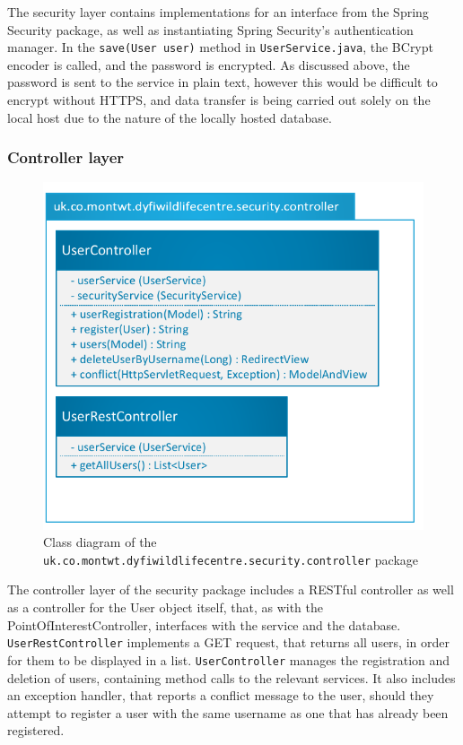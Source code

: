 The security layer contains implementations for an interface from the Spring Security package, as well as instantiating Spring Security's authentication manager. In the \texttt{save(User user)} method in \texttt{UserService.java}, the BCrypt encoder is called, and the password is encrypted. As discussed above, the password is sent to the service in plain text, however this would be difficult to encrypt without HTTPS, and data transfer is being carried out solely on the local host due to the nature of the locally hosted database.

\subsubsection{Controller layer}
\begin{figure}[!htbp]
\includegraphics[scale=0.55]{diagrams/security/controller}
\caption{Class diagram of the \texttt{uk.co.montwt.dyfiwildlifecentre.security.controller} package}
\end{figure}

The controller layer of the security package includes a RESTful controller as well as a controller for the User object itself, that, as with the PointOfInterestController, interfaces with the service and the database. \texttt{UserRestController} implements a GET request, that returns all users, in order for them to be displayed in a list. \texttt{UserController} manages the registration and deletion of users, containing method calls to the relevant services. It also includes an exception handler, that reports a conflict message to the user, should they attempt to register a user with the same username as one that has already been registered.

